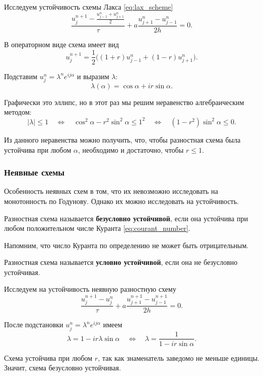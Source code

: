 \documentclass{article}
\begin{document}
\begin{example}
	Исследуем устойчивость схемы Лакса \eqref{eq:lax_scheme}
	\[\frac{u_j^{n+1}-\frac{u_{j-1}^n+u_{j+1}^n}{2}}{\tau}+
	a\frac{u_{j+1}^n-u_{j-1}^n}{2h}=0.\]

	В операторном виде схема имеет вид
	\[u_j^{n+1}=\frac{1}{2}\big((1+r)u_{j-1}^n+(1-r)u_{j+1}^n\big).\]

	Подставим $u_j^n=\lambda^ne^{ij\alpha}$ и выразим $\lambda$:
	\[\lambda(\alpha)=\cos\alpha+ir\sin\alpha.\]

	Графически это эллипс, но в этот раз мы решим неравенство алгебраическим
	методом:
	\[|\lambda|\le 1\quad\Leftrightarrow\quad\cos^2\alpha-r^2\sin^2\alpha\le
	1^2\quad\Leftrightarrow\quad(1-r^2)\sin^2\alpha\le 0.\]

	Из данного неравенства можно получить, что, чтобы разностная схема была
	устойчива при любом $\alpha$, необходимо и достаточно, чтобы $r\le 1$.
\end{example}

\subsubsection{Неявные схемы}
Особенность неявных схем в том, что их невозможно исследовать на монотонность по
Годунову. Однако их можно исследовать на устойчивость.

\begin{define}
	Разностная схема называется \textbf{безусловно устойчивой}, если она
	устойчива при любом положительном числе Куранта
	\eqref{eq:courant_number}.
\end{define}

Напомним, что число Куранта по определению не может быть отрицательным.

\begin{define}
	Разностная схема называется \textbf{условно устойчивой}, если она не
	безусловно устойчивая.
\end{define}

\begin{example}
	Исследуем на устойчивость неявную разностную схему
	\[\frac{u_j^{n+1}-u_j^n}{\tau}+a\frac{u_{j+1}^{n+1}-u_{j-1}^{n+1}}{2h}=
	0.\]

	После подстановки $u_j^n=\lambda^ne^{ij\alpha}$ имеем
	\[\lambda=1-ir\lambda\sin\alpha\quad\Leftrightarrow\quad
	\lambda=\frac{1}{1-ir\sin\alpha}.\]

	Схема устойчива при любом $r$, так как знаменатель заведомо не
	меньше единицы. Значит, схема безусловно устойчивая.
\end{example}
\end{document}
